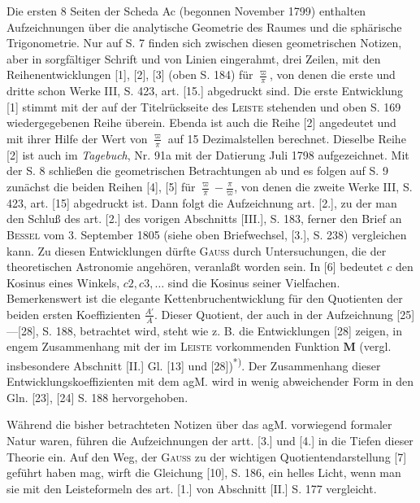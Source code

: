 \begingroup
\makeatletter\tagsleft@true\let\veqno\@@leqno\makeatother
{}
\begin{center}\end{center}
\par\indent Die ersten 8 Seiten der Scheda Ac (begonnen November 1799) enthalten Aufzeichnungen über die analytische Geometrie des Raumes und die sphärische Trigonometrie. Nur auf S. 7 finden sich zwischen diesen geometrischen Notizen, aber in sorgfältiger Schrift und von Linien eingerahmt, drei Zeilen, mit den Reihenentwicklungen [1], [2], [3] (oben S. 184) für $\frac\varpi\pi$, von denen die erste und dritte schon Werke III, S. 423, art. [15.] abgedruckt sind. Die erste Entwicklung [1] stimmt mit der auf der Titelrückseite des \textsc{Leiste} stehenden und oben S. 169 wiedergegebenen Reihe überein. Ebenda ist auch die Reihe [2] angedeutet und mit ihrer Hilfe der Wert von $\frac\varpi\pi$ auf 15 Dezimalstellen berechnet. Dieselbe Reihe [2] ist auch im \textit{Tagebuch}, Nr. 91a mit der Datierung Juli 1798 aufgezeichnet. Mit der S. 8 schließen die geometrischen Betrachtungen ab und es folgen auf S. 9 zunächst die beiden Reihen [4], [5] für $\frac\varpi\pi-\frac\pi\varpi$, von denen die zweite Werke III, S. 423, art. [15] abgedruckt ist. Dann folgt die Aufzeichnung art. [2.], zu der man den Schluß des art. [2.] des vorigen Abschnitts [III.], S. 183, ferner den Brief an \textsc{Bessel} vom 3. September 1805 (siehe oben Briefwechsel, [3.], S. 238) vergleichen kann. Zu diesen Entwicklungen dürfte \textsc{Gauss} durch Untersuchungen, die der theoretischen Astronomie angehören, veranlaßt worden sein. In [6] bedeutet $c$ den Kosinus eines Winkels, $c2,c3,\ldots$ sind die Kosinus seiner Vielfachen. Bemerkenswert ist die elegante Kettenbruchentwicklung für den Quotienten der beiden ersten Koeffizienten $\frac{A'}A$. Dieser Quotient, der auch in der Aufzeichnung [25]—[28], S. 188, betrachtet wird, steht wie z. B. die Entwicklungen [28] zeigen, in engem Zusammenhang mit der im \textsc{Leiste} vorkommenden Funktion $\mathbf M$ (vergl. insbesondere Abschnitt [II.] Gl. [13] und [28])\textsuperscript{*)}. Der Zusammenhang dieser Entwicklungskoeffizienten mit dem agM. wird in wenig abweichender Form in den Gln. [23], [24] S. 188 hervorgehoben.
\par\indent Während die bisher betrachteten Notizen über das agM. vorwiegend formaler Natur waren, führen die Aufzeichnungen der artt. [3.] und [4.] in die Tiefen dieser Theorie ein. Auf den Weg, der \textsc{Gauss} zu der wichtigen Quotientendarstellung [7] geführt haben mag, wirft die Gleichung [10], S. 186, ein helles Licht, wenn man sie mit den Leisteformeln des art. [1.] von Abschnitt [II.] S. 177 vergleicht.
